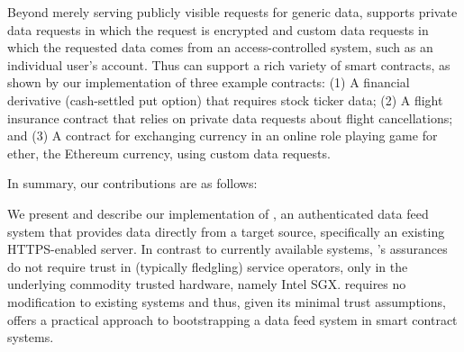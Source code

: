 Beyond merely serving publicly visible requests for generic data, \tc supports private data requests in which the request is encrypted and custom data requests in which the requested data comes from an access-controlled system, such as an individual user's account. Thus \tc can support a rich variety of smart contracts, as shown by our implementation of three example contracts: (1) A financial derivative (cash-settled put option) that requires stock ticker data; (2) A flight insurance contract that relies on private data requests about flight cancellations; and (3) A contract for exchanging currency in an online role playing game for ether, the Ethereum currency, using custom data requests.

In summary, our contributions are as follows:

\vspace{2mm}
 We present and describe our implementation of \tc, an authenticated data feed system that provides data directly from a target source, specifically an existing HTTPS-enabled server. In contrast to currently available systems, \tc's assurances do not require trust in (typically fledgling) service operators, only in the underlying commodity trusted hardware, namely Intel SGX. \tc requires no modification to existing systems and thus, given its minimal trust assumptions, offers a practical approach to bootstrapping a data feed system in smart contract systems.

\vspace{2mm}


